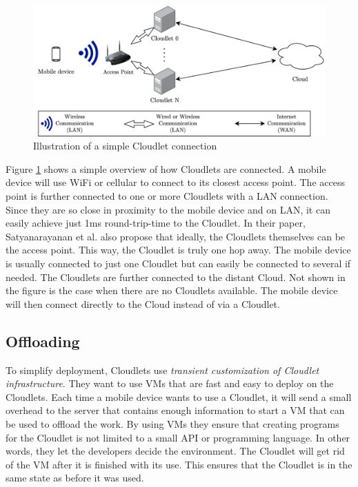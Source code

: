 \begin{figure}[t]
    \centering
    \includegraphics[scale=0.9]{chapters/4_architectures/figures/Cloudlet.png}
    \caption{Illustration of a simple Cloudlet connection}
    \label{fig:Cloudlet}
\end{figure}


Figure \ref{fig:Cloudlet} shows a simple overview of how Cloudlets are connected. A mobile device will use WiFi or cellular to connect to its closest access point. The access point is further connected to one or more Cloudlets with a LAN connection. Since they are so close in proximity to the mobile device and on LAN, it can easily achieve just 1ms round-trip-time to the Cloudlet. In their paper, Satyanarayanan et al.\cite{satyanarayanan_case_2009} also propose that ideally, the Cloudlets themselves can be the access point. This way, the Cloudlet is truly one hop away. The mobile device is usually connected to just one Cloudlet but can easily be connected to several if needed. The Cloudlets are further connected to the distant Cloud. Not shown in the figure is the case when there are no Cloudlets available. The mobile device will then connect directly to the Cloud instead of via a Cloudlet. 


\subsection{Offloading}
To simplify deployment, Cloudlets use \textit{transient customization of Cloudlet infrastructure}. They want to use VMs that are fast and easy to deploy on the Cloudlets. Each time a mobile device wants to use a Cloudlet, it will send a small overhead to the server that contains enough information to start a VM that can be used to offload the work. By using VMs they ensure that creating programs for the Cloudlet is not limited to a small API or programming language. In other words, they let the developers decide the environment. The Cloudlet will get rid of the VM after it is finished with its use. This ensures that the Cloudlet is in the same state as before it was used.



